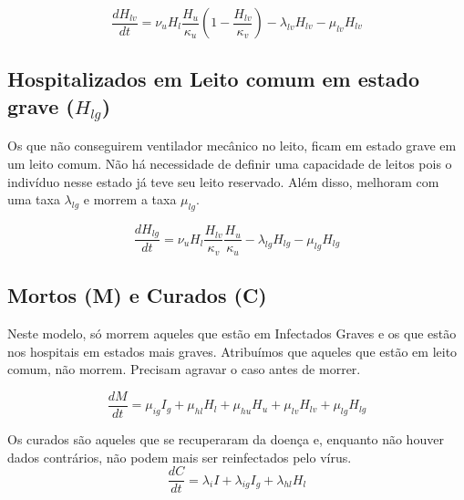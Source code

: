 \documentclass{article}
\begin{document}
\begin{equation}
    \frac{dH_{lv}}{dt}=\nu_u H_l\frac{H_u}{\kappa_{u}}(1-\frac{H_{lv}}{\kappa_{v}})  - \lambda_{lv}H_{lv}-\mu_{lv}H_{lv}
\end{equation}
\subsection{Hospitalizados em Leito comum em estado grave ($H_{lg}$)}
Os que não conseguirem ventilador mecânico no leito, ficam em estado grave em um leito comum. Não há necessidade de definir uma capacidade de leitos pois o indivíduo nesse estado já teve seu leito reservado. Além disso, melhoram com uma taxa $\lambda_{lg}$ e morrem a taxa $\mu_{lg}$.

\begin{equation}
    \frac{dH_{lg}}{dt}=\nu_u H_l\frac{H_{lv}}{\kappa_{v}}\frac{H_u}{\kappa_{u}} -\lambda_{lg}H_{lg}-\mu_{lg}H_{lg} 
\end{equation}

\subsection{Mortos (M) e Curados (C)}
Neste modelo, só morrem aqueles que estão em Infectados Graves e os que estão nos hospitais em estados mais graves. Atribuímos que aqueles que estão em leito comum, não morrem. Precisam agravar o caso antes de morrer.

\begin{equation}
    \frac{dM}{dt}=\mu_{ig}I_{g} +\mu_{hl}H_l + \mu_{hu}H_u +\mu_{lv} H_{lv}+\mu_{lg} H_{lg}
\end{equation}

Os curados são aqueles que se recuperaram da doença e, enquanto não houver dados contrários, não podem mais ser reinfectados pelo vírus.
\begin{equation}
    \frac{dC}{dt}=\lambda_i I + \lambda_{ig} I_g +\lambda_{hl}H_l 
\end{equation}
\end{document}
